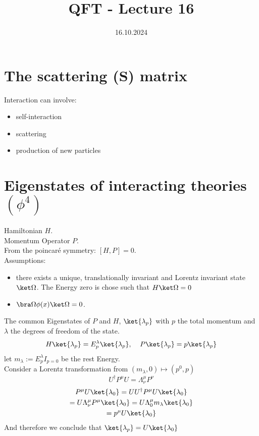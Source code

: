 \documentclass[]{scrartcl}
\title{QFT - Lecture 16}
\author{}
\date{16.10.2024}
\begin{document}
\maketitle
\newpage
\tableofcontents
\newpage

\section{The scattering (S) matrix} 

Interaction can involve:
\begin{itemize}
	\item self-interaction
	\item scattering
	\item production of new particles
\end{itemize}

\section{Eigenstates of interacting theories $(\phi^4)$}
Hamiltonian $H$.\\
Momentum Operator $P$.\\
From the poincaré symmetry: $[H,P] = 0$.\\
Assumptions:
\begin{itemize}
	\item there exists a unique, translationally invariant and Lorentz invariant state $\ket\Omega$. The Energy zero is chose such that $H\ket\Omega = 0$
	\item $\bra\Omega \phi(x) \ket\Omega = 0$.
\end{itemize}

The common Eigenstates of $P$ and $H$, $\ket{\lambda_p}$ with $p$ the total momentum and $\lambda$ the degrees of freedom of the state.
\begin{equation}
	H\ket{\lambda_p} = E_p^\lambda\ket{\lambda_p},\;\;\;\; P\ket{\lambda_p} = p\ket{\lambda_p}
\end{equation} 
let $m_\lambda := E_p^\lambda I_{p=0}$ be the rest Energy.\\
Consider a Lorentz transformation from $(m_\lambda, 0) \mapsto (p^0, p)$\\
$$
	U^\dagger P^\mu U = \Lambda^\mu_\nu P^\nu
$$
\begin{gather}
	P^\mu U\ket{\lambda_0} = UU^\dagger P^\mu U \ket{\lambda_0}\\ 
	= U\Lambda^\mu_\nu P^\mu \ket{\lambda_0} = U \Lambda^\mu_0 m_\lambda\ket{\lambda_0}\\
	= p^\mu U\ket{\lambda_0}
\end{gather}
And therefore we conclude that $\ket{\lambda_p} = U\ket{\lambda_0}$
\end{document}
